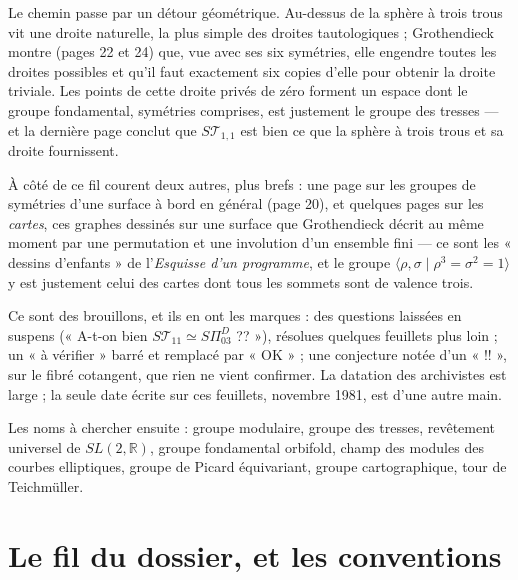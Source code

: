 \documentclass[11pt,a4paper]{article}
\begin{document}
\begin{resume}
Le chemin passe par un détour géométrique. Au-dessus de la sphère à trois trous
vit une droite naturelle, la plus simple des droites tautologiques ; Grothendieck
montre (pages 22 et 24) que, vue avec ses six symétries, elle engendre toutes les
droites possibles et qu'il faut exactement six copies d'elle pour obtenir la droite
triviale. Les points de cette droite privés de zéro forment un espace dont le
groupe fondamental, symétries comprises, est justement le groupe des tresses —
et la dernière page conclut que $S\mathcal{T}_{1,1}$ est bien ce que la
sphère à trois trous et sa droite fournissent.

À côté de ce fil courent deux autres, plus brefs : une page sur les groupes de
symétries d'une surface à bord en général (page 20), et quelques pages sur les
\emph{cartes}, ces graphes dessinés sur une surface que Grothendieck décrit au
même moment par une permutation et une involution d'un ensemble fini — ce sont
les « dessins d'enfants » de l'\emph{Esquisse d'un programme}, et le groupe
$\langle \rho, \sigma \mid \rho^3 = \sigma^2 = 1 \rangle$ y est justement celui
des cartes dont tous les sommets sont de valence trois.

Ce sont des brouillons, et ils en ont les marques : des questions laissées en
suspens (« A-t-on bien $S\mathcal{T}_{11} \simeq S\Pi^{D}_{03}$ ?? »), résolues
quelques feuillets plus loin ; un « à vérifier » barré et remplacé par « OK » ;
une conjecture notée d'un « !! », sur le fibré cotangent, que rien ne vient
confirmer. La datation des archivistes est large ; la seule date écrite sur ces
feuillets, novembre 1981, est d'une autre main.

Les noms à chercher ensuite : groupe modulaire, groupe des tresses, revêtement
universel de $SL(2, \mathbb{R})$, groupe fondamental orbifold, champ des modules des
courbes elliptiques, groupe de Picard équivariant, groupe cartographique, tour de
Teichmüller.

\end{resume}

\section*{Le fil du dossier, et les conventions}
\end{document}
